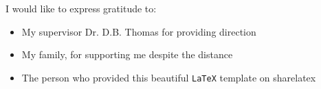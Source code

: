 \documentclass[../thesis.tex]{subfiles}
\begin{document}
\cleardoublepage


\begin{acknowledgements}

I would like to express gratitude to:

\begin{itemize}
 \item My supervisor Dr. D.B. Thomas for providing direction
 \vspace*{3mm}
 \item My family, for supporting me despite the distance
 \vspace*{3mm}
 \item The person who provided this beautiful \texttt{LaTeX} template on sharelatex
\end{itemize}

\end{acknowledgements}
\end{document}

